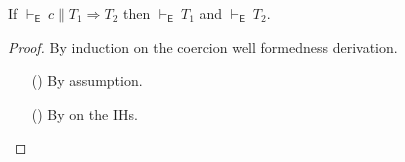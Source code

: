 \documentclass[9pt]{extarticle}
\newcommand{\ottnt}[1]{\mathit{#1}}
\begin{document}
{\iffull
\begin{lemma}
  \label{lem:coercionregularity}
  If $ \mathord{  \vdash _{  \mathsf{E}  } }~ \ottnt{c}   \mathrel{\parallel}   \ottnt{T_{{\mathrm{1}}}}  \Rightarrow  \ottnt{T_{{\mathrm{2}}}} $ then $ \mathord{  \vdash _{  \mathsf{E}  } }~ \ottnt{T_{{\mathrm{1}}}} $ and $ \mathord{  \vdash _{  \mathsf{E}  } }~ \ottnt{T_{{\mathrm{2}}}} $.
\begin{proof}
    By induction on the coercion well formedness derivation.
\begin{itemize}
      \item[(\A{Refine})] By assumption.
      \item[(\A{Fun})] By  on the IHs.
    \end{itemize}
  \end{proof}
\end{lemma}
\fi}
\end{document}
